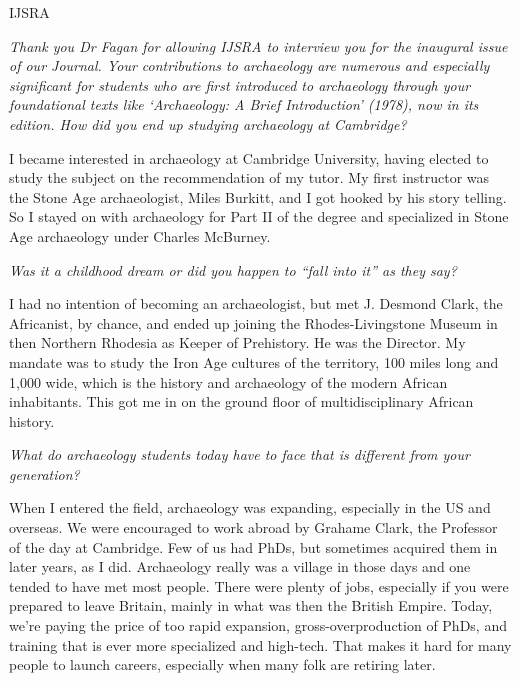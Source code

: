 \begin{labeling}{IJSRA}	
\item[IJSRA (International Journal of Student Research in Archaeology)] \emph{Thank you Dr Fagan for allowing IJSRA to interview you for the inaugural issue of our Journal. Your contributions to archaeology are numerous and especially significant for students who are first introduced to archaeology through your foundational texts like \emph{‘Archaeology: A Brief Introduction’} (1978), now in its  edition. \newline
How did you end up studying archaeology at Cambridge?}
	
\item[BMF (Dr. Brian M Fagan)] I became interested in archaeology at Cambridge University, having elected to study the subject on the recommendation of my tutor. My first instructor was the Stone Age archaeologist, Miles Burkitt, and I got hooked by his story telling. So I stayed on with archaeology for Part II of the degree and specialized in Stone Age archaeology under Charles McBurney.

\item[IJSRA]\emph{Was it a childhood dream or did you happen to “fall into it” as they say?}

\item[BMF] I had no intention of becoming an archaeologist, but met J. Desmond Clark, the Africanist, by chance, and ended up joining the Rhodes-Livingstone Museum in then Northern Rhodesia as Keeper of Prehistory. He was the Director. My mandate was to study the Iron Age cultures of the territory, 100 miles long and 1,000 wide, which is the history and archaeology of the modern African inhabitants. This got me in on the ground floor of multidisciplinary African history.

\item[IJSRA]\emph{What do archaeology students today have to face that is different from your generation?}

\item[BMF] When I entered the field, archaeology was expanding, especially in the US and overseas. We were encouraged to work abroad by Grahame Clark, the Professor of the day at Cambridge. Few of us had PhDs, but sometimes acquired them in later years, as I did. Archaeology really was a village in those days and one tended to have met most people. There were plenty of jobs, especially if you were prepared to leave Britain, mainly in what was then the British Empire. Today, we’re paying the price of too rapid expansion, gross-overproduction of PhDs, and training that is ever more specialized and high-tech. That makes it hard for many people to launch careers, especially when many folk are retiring later.
	

\end{labeling}
